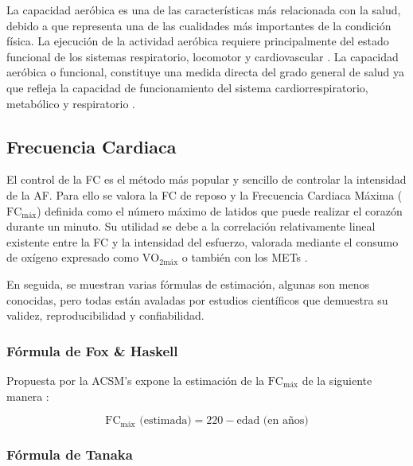 La capacidad aeróbica es una de las características más relacionada con la salud, debido a que representa una de las cualidades más importantes de la condición física. La ejecución de la actividad aeróbica requiere principalmente del estado funcional de los sistemas respiratorio, locomotor y cardiovascular \citep{Riebe2018ACSM}. La capacidad aeróbica o funcional, constituye una medida directa del grado general de salud ya que refleja la capacidad de funcionamiento del sistema cardiorrespiratorio, metabólico y respiratorio \citep{Gonzalez2018Analisis,Riebe2018ACSM}.

\subsection{Frecuencia Cardiaca}
\label{subsec:frecuencia_cardiaca}

El control de la FC es el método más popular y sencillo de controlar la intensidad de la AF. Para ello se valora la FC de reposo y la Frecuencia Cardiaca Máxima ($\text{FC}_{\text{máx}}$) definida como el número máximo de latidos que puede realizar el corazón durante un minuto. Su utilidad se debe a la correlación relativamente lineal existente entre la FC y la intensidad del esfuerzo, valorada mediante el consumo de oxígeno expresado como $\mathrm{VO}_{2\text{máx}}$ o también con los METs \citep{Abellan2014Prescripcion}.

En seguida, se muestran varias fórmulas de estimación, algunas son menos conocidas, pero todas están avaladas por estudios científicos que demuestra su validez, reproducibilidad y confiabilidad.

\subsubsection{Fórmula de Fox \& Haskell}
\label{subsubsec:formula_fox_haskell}

Propuesta por la ACSM's expone la estimación de la $\text{FC}_{\text{máx}}$ de la siguiente manera \citep{Fox1968Physical}:

\begin{equation}
\text{FC}_{\text{máx}} \text{ (estimada)} = 220 - \text{edad (en años)}
\label{eq:fox_haskell}
\end{equation}

\subsubsection{Fórmula de Tanaka}
\label{subsubsec:formula_tanaka}

